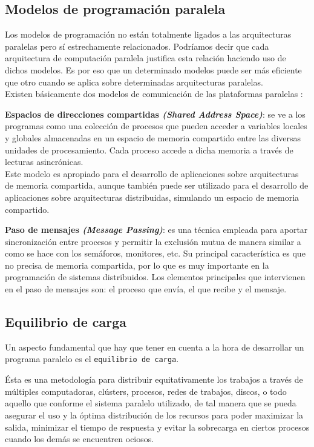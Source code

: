 \subsection{Modelos de programación paralela}

Los modelos de programación no están totalmente ligados a las arquitecturas paralelas pero sí estrechamente relacionados. Podríamos decir que cada arquitectura de computación paralela justifica esta relación haciendo uso de dichos modelos. Es por eso que un determinado modelos puede ser más eficiente que otro cuando se aplica sobre determinadas arquitecturas paralelas.\\
Existen básicamente dos modelos de comunicación de las plataformas paralelas \cite{gramagrubta}:

\textbf{\newline Espacios de direcciones compartidas \textit{(Shared Address Space)}}: se ve a los programas como una colección de procesos que pueden acceder a variables locales y globales almacenadas en un espacio de memoria compartido entre las diversas unidades de procesamiento. Cada proceso accede a dicha memoria a través de lecturas asincrónicas.\\
Este modelo es apropiado para el desarrollo de aplicaciones sobre arquitecturas de memoria compartida, aunque también puede ser utilizado para el desarrollo de aplicaciones sobre arquitecturas distribuidas, simulando un espacio de memoria compartido.

\textbf{\newline Paso de mensajes \textit{(Message Passing)}}: es una técnica empleada para aportar sincronización entre procesos y permitir la exclusión mutua de manera similar a como se hace con los semáforos, monitores, etc. Su principal característica es que no precisa de memoria compartida, por lo que es muy importante en la programación de sistemas distribuidos. Los elementos principales que intervienen en el paso de mensajes son: el proceso que envía, el que recibe y el mensaje.

\subsection{Equilibrio de carga}

Un aspecto fundamental que hay que tener en cuenta a la hora de desarrollar un programa paralelo es el \texttt{equilibrio de carga}.

Ésta es una metodología para distribuir equitativamente los trabajos a través de múltiples computadoras, clústers, procesos, redes de trabajos, discos, o todo aquello que conforme el sistema paralelo utilizado, de tal manera que se pueda asegurar el uso y la óptima distribución de los recursos para poder maximizar la salida, minimizar el tiempo de respuesta y evitar la sobrecarga en ciertos procesos cuando los demás se encuentren ociosos.

